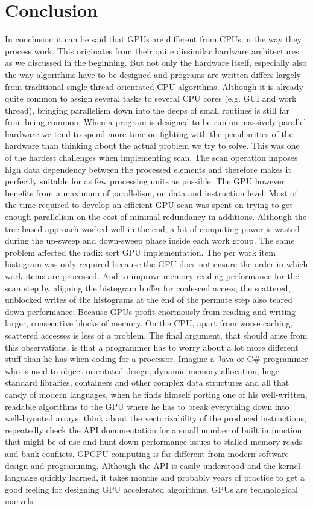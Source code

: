 \section{Conclusion}

In conclusion it can be said that GPUs are different from CPUs in the way they process work. This originates from their quite dissimilar hardware architectures as we discussed in the beginning. But not only the hardware itself, especially also the way algorithms have to be designed and programs are written differs largely from traditional single-thread-orientated CPU algorithms. Although it is already quite common to assign several tasks to several CPU cores (e.g. GUI and work thread), bringing parallelism down into the deeps of small routines is still far from being common. When a program is designed to be run on massively parallel hardware we tend to spend more time on fighting with the peculiarities of the hardware than thinking about the actual problem we try to solve. This was one of the hardest challenges when implementing scan. The scan operation imposes high data dependency between the processed elements and therefore makes it perfectly suitable for as few processing units as possible. The GPU however benefits from a maximum of parallelism, on data and instruction level. Most of the time required to develop an efficient GPU scan was spent on trying to get enough parallelism on the cost of minimal redundancy in additions. Although the tree based approach worked well in the end, a lot of computing power is wasted during the up-sweep and down-sweep phase inside each work group. The same problem affected the radix sort GPU implementation. The per work item histogram was only required because the GPU does not ensure the order in which work items are processed. And to improve memory reading performance for the scan step by aligning the histogram buffer for coalesced access, the scattered, unblocked writes of the histograms at the end of the permute step also teared down performance; Because GPUs profit enormously from reading and writing larger, consecutive blocks of memory. On the CPU, apart from worse caching, scattered accesses is less of a problem. The final argument, that should arise from this observations, is that a programmer has to worry about a lot more different stuff than he has when coding for a processor. Imagine a Java or C\# programmer who is used to object orientated design, dynamic memory allocation, huge standard libraries, containers and other complex data structures and all that candy of modern languages, when he finds himself porting one of his well-written, readable algorithms to the GPU where he has to break everything down into well-layouted arrays, think about the vectorizability of the produced instructions, repeatedly check the API documentation for a small number of built in function that might be of use and hunt down performance issues to stalled memory reads and bank conflicts. GPGPU computing is far different from modern software design and programming. Although the API is easily understood and the kernel language quickly learned, it takes months and probably years of practice to get a good feeling for designing GPU accelerated algorithms. GPUs are technological marvels 